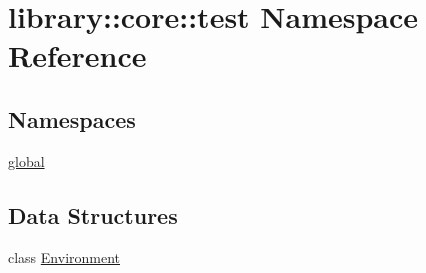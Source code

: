 \hypertarget{namespacelibrary_1_1core_1_1test}{}\section{library\+:\+:core\+:\+:test Namespace Reference}
\label{namespacelibrary_1_1core_1_1test}
\subsection*{Namespaces}
\begin{DoxyCompactItemize}
\item 
 \hyperlink{namespacelibrary_1_1core_1_1test_1_1global}{global}
\end{DoxyCompactItemize}
\subsection*{Data Structures}
\begin{DoxyCompactItemize}
\item 
class \hyperlink{classlibrary_1_1core_1_1test_1_1Environment}{Environment}
\end{DoxyCompactItemize}
